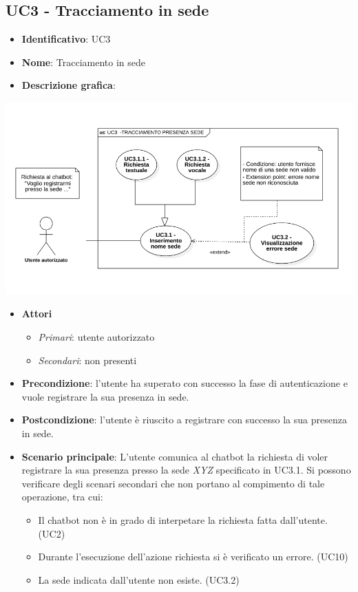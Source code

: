 \subsection{UC3 - Tracciamento  in sede}
\begin{itemize}
    \item \textbf{Identificativo}: UC3
    \item \textbf{Nome}: Tracciamento  in sede
    \item \textbf{Descrizione grafica}:
\end{itemize}
\begin{center}
    \includegraphics[scale=0.50]{images/UC3.png} 
\end{center}
\begin{itemize}
    \item \textbf{Attori}
 \begin{itemize} 
    \item \textit{Primari}: utente autorizzato
    \item \textit{Secondari}: non presenti
 \end{itemize}
 \item \textbf{Precondizione}: l'utente ha superato con successo la fase di autenticazione e vuole registrare la sua presenza in sede. 
 \item \textbf{Postcondizione}: l'utente è riuscito a registrare con successo la sua presenza in sede. 
 \item \textbf{Scenario principale}: L'utente comunica al chatbot la richiesta di voler registrare la sua presenza presso la sede \textit{XYZ} specificato in UC3.1. Si possono verificare degli scenari secondari che non portano al compimento di tale operazione, tra cui:
    \begin{itemize}
        \item Il chatbot non è in grado di interpetare la richiesta fatta dall'utente. (UC2)
        \item Durante l'esecuzione dell'azione richiesta si è verificato un errore. (UC10)
        \item La sede indicata dall'utente non esiste. (UC3.2)
    \end{itemize}
\end{itemize}
\newpage

